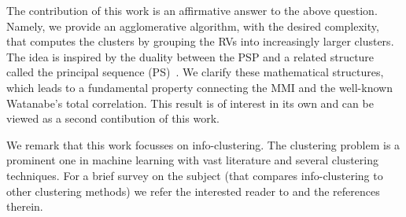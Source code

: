 The contribution of this work is an affirmative answer to the above question. 
Namely, we provide an agglomerative algorithm, with the desired complexity, that computes the 
clusters by grouping the RVs into increasingly larger clusters.
The idea is inspired by the duality between the PSP and a related structure called the
principal sequence (PS)~\cite{fujishige80,fujishige05,fujishige-pp-revisited}. We clarify these
mathematical structures, which leads to a fundamental property connecting the MMI and the well-known
Watanabe's total correlation. This result is of interest in its own and can be viewed as a second
contibution of this work. 

We remark that this work focusses on info-clustering. The clustering problem is a prominent
one in machine learning with vast literature and several clustering techniques. For a brief survey
on the subject (that compares info-clustering to other clustering methods) we refer the interested
reader to \cite{chan16cluster} and the references therein.

